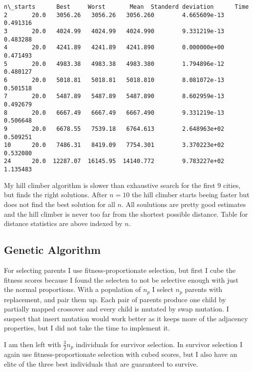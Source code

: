 \documentclass[11pt]{article}
\makeatletter
\newcommand{\boxspacing}{\kern\kvtcb@left@rule\kern\kvtcb@boxsep}
\newcommand{\prompt}[4]{
        \ttfamily\llap{{\color{#2}[#3]:\hspace{3pt}#4}}\vspace{-\baselineskip}
    }
\makeatother
\begin{document}
            \begin{tcolorbox}[breakable, size=fbox, boxrule=.5pt, pad at break*=1mm, opacityfill=0]
\prompt{Out}{outcolor}{24}{\boxspacing}
\begin{Verbatim}[commandchars=\\\{\}]
    n\_starts      Best     Worst       Mean  Standerd deviation      Time
2       20.0   3056.26   3056.26   3056.260        4.665609e-13  0.491316
3       20.0   4024.99   4024.99   4024.990        9.331219e-13  0.483288
4       20.0   4241.89   4241.89   4241.890        0.000000e+00  0.471493
5       20.0   4983.38   4983.38   4983.380        1.794896e-12  0.480127
6       20.0   5018.81   5018.81   5018.810        8.081072e-13  0.501518
7       20.0   5487.89   5487.89   5487.890        8.602959e-13  0.492679
8       20.0   6667.49   6667.49   6667.490        9.331219e-13  0.506648
9       20.0   6678.55   7539.18   6764.613        2.648963e+02  0.509251
10      20.0   7486.31   8419.09   7754.301        3.370223e+02  0.532080
24      20.0  12287.07  16145.95  14140.772        9.783227e+02  1.135483
\end{Verbatim}
\end{tcolorbox}
        
    My hill climber algorithm is slower than exhaustive search for the first
9 cities, but finds the right solutions. After \(n=10\) the hill climber
starts beeing faster but does not find the best solution for all \(n\).
All soulutions are pretty good estimates and the hill climber is never
too far from the shortest possible distance. Table for distance
statistics are above indexed by \(n\).

    \subsection*{Genetic Algorithm}\label{genetic-algorithm}

For selecting parents I use fitness-proportionate selection, but first I
cube the fitness scores because I found the selecten to not be selective
enough with just the normal proportions. With a population of \(n_p\) I
select \(n_p\) parents with replacement, and pair them up. Each pair of
parents produce one child by partially mapped crossover and every child
is mutated by swap mutation. I suspect that insert mutation would work
better as it keeps more of the adjacency properties, but I did not take
the time to implement it.

I am then left with \(\frac{3}{2}n_p\) individuals for survivor
selection. In survivor selection I again use fitness-proportionate
selection with cubed scores, but I also have an elite of the three best
individuals that are guaranteed to survive.
\end{document}
